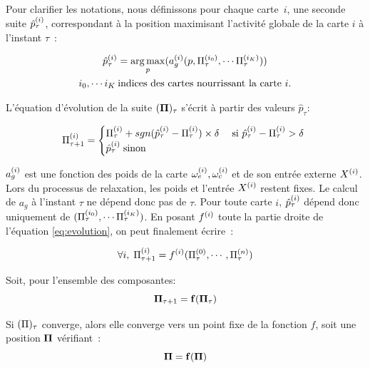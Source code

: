\documentclass[../main]{subfiles}
\begin{document}
Pour clarifier les notations, nous définissons  pour chaque carte~$i$, une seconde suite $\hat{p}^{({i})}_\tau$, correspondant à la position maximisant l'activité globale de la carte $i$ à l'instant $\tau$~:

\begin{equation}
\begin{gathered}
\hat{p}^{({i})}_{\tau} = \operatorname*{arg\,max}_p(a_g^{({i})}(p,\Pi^{({i_0})}_\tau, \cdots \Pi^{({i_K})}_\tau))\\
 i_0, \cdots i_K \: \text{indices des cartes nourrissant la carte $i$}.
\end{gathered}
\label{eq:pstar}
\end{equation}

L'équation d'évolution de la suite $(\mathbf{\Pi})_\tau$ s'écrit à partir des valeurs $\hat{p}_\tau$:

\begin{equation}
\Pi^{({i})}_{\tau+1} = 
\begin{cases}
\Pi^{({i})}_{\tau} + sgn(\hat{p}^{({i})}_{\tau} - \Pi^{({i})}_{\tau}) \times \delta \; & \text{si $\hat{p}^{({i})}_{\tau} - \Pi^{({i})}_{\tau} > \delta$ } \\
\hat{p}^{({i})}_{\tau} \; \text{sinon}	
\end{cases}
\label{eq:evolution}
\end{equation}

$a_g^{({i})}$ est une fonction des poids de la carte $\omega_{e}^{({i})}, \omega_{c}^{({i})}$ et de son entrée externe $X^{({i})}$. 
Lors du processus de relaxation, les poids et l'entrée $X^{({i})}$ restent fixes. 
Le calcul de $a_g$ à l'instant $\tau$ ne dépend donc pas de $\tau$.
Pour toute carte $i$, $\hat{p}^{({i})}_{\tau}$ dépend donc uniquement de $(\Pi^{({i_0})}_\tau, \cdots \Pi^{({i_K})}_\tau)$. 
En posant $f^{({i})}$ toute la partie droite de l'équation \ref{eq:evolution}, on peut finalement écrire~:

\begin{equation}
\forall i, \; \Pi^{({i})}_{\tau +1} = f^{({i})}(\Pi^{({0})}_\tau,\cdots,\Pi^{({n})}_\tau)
\label{eq:fonction}
\end{equation}

Soit, pour l'ensemble des composantes: 
\begin{equation}
\mathbf{\Pi}_{\tau+1} = \mathbf{f}(\mathbf{\Pi}_\tau)
\end{equation}

Si $(\Pi)_\tau$ converge, alors elle converge vers un point fixe de la fonction $f$, soit une position $\mathbf{\Pi}$ vérifiant~:
\begin{equation}
\mathbf{\Pi} = \mathbf{f}(\mathbf{\Pi})
\label{eq:suite}
\end{equation}
\end{document}
